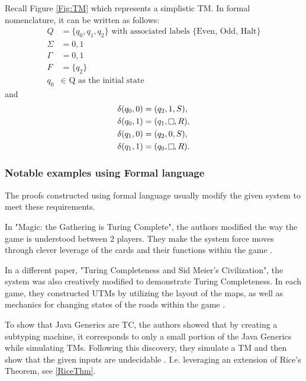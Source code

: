 Recall Figure \ref{Fig:TM} which represents a simplistic TM.
In formal nomenclature, it can be written as follows:
\[
    \begin{aligned}
        Q &= \{q_{0}, q_{1}, q_{2}\} \text{ with associated labels \{Even, Odd, Halt\}}\\
        \Sigma &= {0,1}\\
        \Gamma &= {0,1}\\
        F &= \{q_{2}\}\\
        q_{0} &\in \text{ Q as the initial state}
    \end{aligned}
\]
and
\[
    \begin{aligned}
        \delta (q_{0}, 0) &= (q_{2}, 1, S),\\
        \delta (q_{0}, 1) &= (q_{1}, \raisebox{0.1cm}{\fbox{}}, R),\\
        \delta (q_{1}, 0) &= (q_{2}, 0, S),\\
        \delta (q_{1}, 1) &= (q_{0}, \raisebox{0.1cm}{\fbox{}}, R).\\
    \end{aligned}
\]

\subsubsection{Notable examples using Formal language}

The proofs constructed using formal language usually modify the given system to meet these requirements.

In "Magic: the Gathering is Turing Complete", the authors modified the way the game is understood between 2 players.
They make the system force moves through clever leverage of the cards and their functions within the game \cite{MtGTC}.

In a different paper, "Turing Completeness and Sid Meier's Civilization", the system was also creatively modified to demonstrate Turing Completeness.
In each game, they constructed UTMs by utilizing the layout of the maps, as well as mechanics for changing states of the roads within the game \cite{CivTC}.

To show that Java Generics are TC, the authors showed that by creating a subtyping machine, it corresponds to only a small portion of the Java Generics while simulating TMs.
Following this discovery, they simulate a TM and then show that the given inputs are undecidable \cite{JavaGenericsTC}.
I.e. leveraging an extension of Rice's Theorem, see \ref{RiceThm}.

